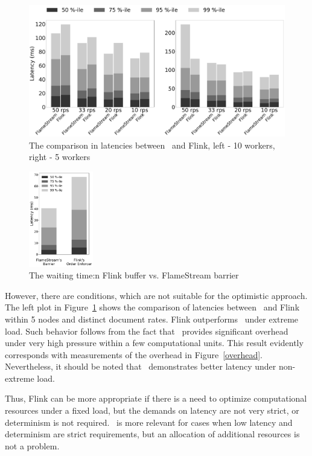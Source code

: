 \begin{figure}[ht]
  \centering
  \includegraphics[width=\textwidth]{pics/comp-index-quantiles}
  \caption{The comparison in latencies between \FlameStream\ and Flink, left - 10 workers, right - 5 workers }
  \label {fs-index-quantiles}
\end{figure}

\begin{figure}[ht]
  \centering
  \includegraphics[width=0.25\textwidth]{pics/buffer-vs-barrier}
  \caption{The waiting time:n Flink buffer vs. FlameStream barrier}
  \label {buffer-vs-barrier}
\end{figure}

However, there are conditions, which are not suitable for the optimistic approach. The left plot in Figure~\ref{fs-index-quantiles} shows the comparison of latencies between \FlameStream\ and Flink within 5 nodes and distinct document rates. Flink outperforms \FlameStream\ under extreme load. Such behavior follows from the fact that \FlameStream\ provides significant overhead under very high pressure within a few computational units. This result evidently corresponds with measurements of the overhead in Figure~\ref{overhead}. Nevertheless, it should be noted that \FlameStream\ demonstrates better latency under non-extreme load.

Thus, Flink can be more appropriate if there is a need to optimize computational resources under a fixed load, but the demands on latency are not very strict, or determinism is not required. \FlameStream\ is more relevant for cases when low latency and determinism are strict requirements, but an allocation of additional resources is not a problem.  

